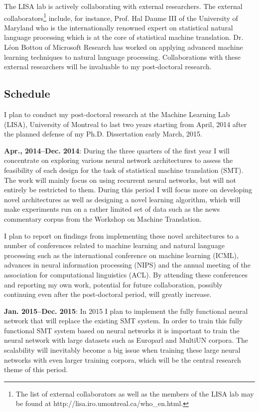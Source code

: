 \documentclass[11pt, oneside]{essay}
\begin{document}
The LISA lab is actively collaborating with external researchers.
The external collaborators\footnote{The list of external
collaborators as well as the members of the LISA lab may be
found at http://lisa.iro.umontreal.ca/who\_en.html.}
include, for instance, Prof. Hal Daume III of the
University of Maryland who is the internationally
renowned expert on statistical natural language
processing which is at the core of statistical machine
translation. Dr. L\'eon Bottou of Microsoft Research has
worked on applying advanced machine learning techniques
to natural language processing.  Collaborations with
these external researchers will be invaluable to my
post-doctoral research.


\subsection{Schedule}

I plan to conduct my post-doctoral research at the Machine
Learning Lab (LISA), University of Montreal to last two years
starting from April, 2014 after the planned defense of my Ph.D.
Dissertation early March, 2015. 

\textbf{Apr., 2014--Dec. 2014}: During the three quarters of the first
year I will concentrate on exploring various neural network
architectures to assess the feasibility of each design for the
task of statistical machine translation (SMT). The work will mainly
focus on using recurrent neural networks, but will not entirely
be restricted to them. During this period I will focus more on
developing novel architectures as well as designing a novel
learning algorithm, which will make experiments run on a rather
limited set of data such as the news commentary corpus from the
Workshop on Machine Translation.

I plan to report on findings from implementing these novel
architectures to a number of conferences related to machine
learning and natural language processing such as the
international conference on machine learning (ICML), advances in
neural information processing (NIPS) and the annual meeting of
the association for computational linguistics (ACL). By attending
these conferences and reporting my own work, potential for future
collaboration, possibly continuing even after the post-doctoral
period, will greatly increase.

\textbf{Jan. 2015--Dec. 2015}: In 2015 I plan to implement the
fully functional neural network that will replace the existing
SMT system. In order to train this fully functional SMT system
based on neural networks it is important to train the neural
network with large datasets such as Europarl \citep{Koehn2005}
and MultiUN \citep{Eisele2010} corpora. The scalability will
inevitably become a big issue when training these large neural
networks with even larger training corpora, which will be the
central research theme of this period.
\end{document}
